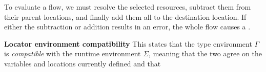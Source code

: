 \documentclass[nonacm, dvipsnames, sigconf]{acmart}
\begin{document}
To evaluate a flow, we must resolve the selected resources, subtract them from their parent locations, and finally add them all to the destination location.
If either the subtraction or addition results in an error, the whole flow causes a \revert.

\begin{mathpar}

\end{mathpar}

\begin{mathpar}

\end{mathpar}

\framebox{$\Gamma \compat \Sigma$} \textbf{Locator environment compatibility}
This states that the type environment $\Gamma$ is \emph{compatible} with the runtime environment $\Sigma$, meaning that the two agree on the variables and locations currently defined and that
\end{document}
